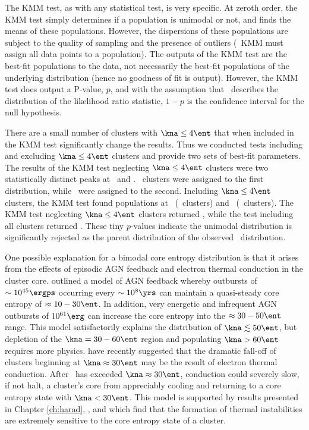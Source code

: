 The KMM test, as with any statistical test, is very specific. At
zeroth order, the KMM test simply determines if a population is
unimodal or not, and finds the means of these populations. However,
the dispersions of these populations are subject to the quality of
sampling and the presence of outliers (\eg\ KMM must assign all data
points to a population). The outputs of the KMM test are the best-fit
populations to the data, not necessarily the best-fit populations of
the underlying distribution (hence no goodness of fit is
output). However, the KMM test does output a P-value, $p$, and with
the assumption that \chisq\ describes the distribution of the
likelihood ratio statistic, $1-p$ is the confidence interval for the
null hypothesis.

There are a small number of clusters with $\kna \le 4 \ent$ that when
included in the KMM test significantly change the results. Thus we
conducted tests including and excluding $\kna \le 4 \ent$ clusters and
provide two sets of best-fit parameters. The results of the KMM test
neglecting $\kna \le 4 \ent$ clusters were two statistically distinct
peaks at \kmma\ and \kmmb. \kmmc\ clusters were assigned to the first
distribution, while \kmmd\ were assigned to the second. Including
$\kna \le 4 \ent$ clusters, the KMM test found populations at \kmmf\
(\kmmh\ clusters) and \kmmg\ (\kmmi\ clusters). The KMM test
neglecting $\kna \le 4 \ent$ clusters returned \kmme, while the test
including all clusters returned \kmmj. These tiny $p$-values indicate
the unimodal distribution is significantly rejected as the parent
distribution of the observed \kna\ distribution.

One possible explanation for a bimodal core entropy distribution is
that it arises from the effects of episodic AGN feedback and electron
thermal conduction in the cluster core. \citet{agnframework} outlined
a model of AGN feedback whereby outbursts of $\sim 10^{45} \ergps$
occurring every $\sim 10^8 \yrs$ can maintain a quasi-steady core
entropy of $\approx 10-30 \ent$. In addition, very energetic and
infrequent AGN outbursts of $10^{61} \erg$ can increase the core
entropy into the $\approx 30-50 \ent$ range. This model satisfactorily
explains the distribution of $\kna \lesssim 50 \ent$, but depletion of
the $\kna = 30-60 \ent$ region and populating $\kna > 60 \ent$
requires more physics. \citet{conduction} have recently suggested that
the dramatic fall-off of clusters beginning at $\kna \approx 30 \ent$
may be the result of electron thermal conduction. After \kna\ has
exceeded $\kna \approx 30 \ent$, conduction could severely slow, if
not halt, a cluster's core from appreciably cooling and returning to a
core entropy state with $\kna < 30 \ent$. This model is supported by
results presented in Chapter \ref{ch:harad},
\citet{2008arXiv0804.3823G}, and \citet{2008arXiv0802.1864R} which
find that the formation of thermal instabilities are extremely
sensitive to the core entropy state of a cluster.

